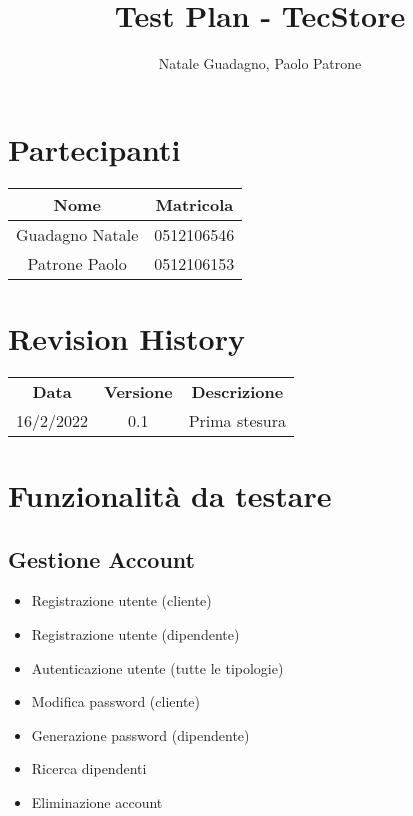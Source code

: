 \documentclass[12pt]{article}
\author{Natale Guadagno, Paolo Patrone}
\title{Test Plan - TecStore}
\begin{document}
\maketitle
\newpage
\tableofcontents
\newpage
{}
\section*{Partecipanti}
\begin{center}
\begin{tabular} {|c|c|}
\hline
\textbf{Nome} & \textbf{Matricola} \\
\hline
Guadagno Natale & 0512106546 \\
Patrone Paolo & 0512106153 \\
\hline
\end{tabular}
\end{center}


\section*{Revision History}
\begin{center}
\begin{tabular} {|c|c|c|}
\hline
\textbf{Data} & \textbf{Versione} & \textbf{Descrizione} \\
16/2/2022 & 0.1 & Prima stesura \\
\hline

\hline
\end{tabular}
\end{center}

\newpage

\section{Funzionalità da testare}

\subsection{Gestione Account}
\begin{itemize}
\item Registrazione utente (cliente)
\item Registrazione utente (dipendente)
\item Autenticazione utente (tutte le tipologie)
\item Modifica password (cliente)
\item Generazione password (dipendente)
\item Ricerca dipendenti
\item Eliminazione account
\end{itemize}
\end{document}
